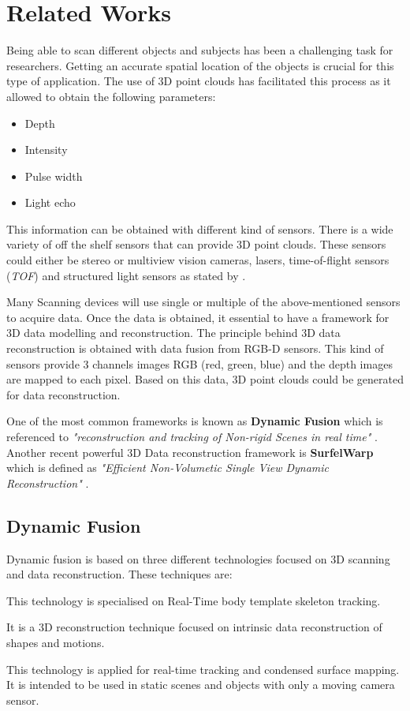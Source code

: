 \documentclass[12pt]{report}
\begin{document}
\chapter{Related Works}
Being able to scan different objects and subjects has been a challenging task for researchers. Getting an accurate spatial location of the objects is crucial for this type of application.
The use of 3D point clouds has facilitated this process as it allowed to obtain the following parameters:
\begin{itemize}[]
  \itemsep0em 
  \item Depth
  \item Intensity
  \item Pulse width
  \item Light echo
\end{itemize}
This information can be obtained with different kind of sensors. There is a wide variety of off the shelf sensors that can provide 3D point clouds. 
These sensors could either be stereo or multiview vision cameras, lasers, time-of-flight sensors (\textit{TOF}) and structured light sensors as stated by .

Many Scanning devices will use single or multiple of the above-mentioned sensors to acquire data. Once the data is obtained, it essential to have a framework for 3D data modelling and reconstruction.
The principle behind 3D data reconstruction is obtained with data fusion from RGB-D sensors. This kind of sensors provide 3 channels images RGB (red, green, blue) and the depth images are mapped to each pixel. Based on this data, 3D point clouds could be generated for data reconstruction.

One of the most common frameworks is known as \textbf{Dynamic Fusion} which is referenced to \textit{"reconstruction and tracking of Non-rigid Scenes in real time"} .
Another recent powerful 3D Data reconstruction framework is \textbf{SurfelWarp} which is defined as \textit{"Efficient Non-Volumetic Single View Dynamic Reconstruction"} .

\section{Dynamic Fusion}
Dynamic fusion is based on three different technologies focused on 3D scanning and data reconstruction. These techniques are: 

\begin{description}[style=nextline]
  \item[DART (Dense Articulated Real-Time Tracking)] This technology is specialised on Real-Time body template skeleton tracking.
  \item[Animation Cartography] It is a 3D reconstruction technique focused on intrinsic data reconstruction of shapes and motions. 
  \item[Kinect Fusion] This technology is applied for real-time tracking and condensed surface mapping. It is intended to be used in static scenes and objects with only a moving camera sensor. 
\end{description} 
\end{document}
